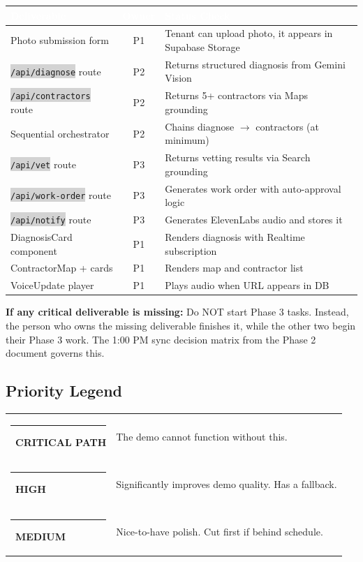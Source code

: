 \documentclass[11pt, a4paper]{article}
\newcommand{\critical}{\textcolor{critred}{\rule{6pt}{6pt}}~\textcolor{critred}{\scriptsize\textbf{CRITICAL PATH}}}
\newcommand{\highpri}{\textcolor{highamber}{\rule{6pt}{6pt}}~\textcolor{highamber}{\scriptsize\textbf{HIGH}}}
\newcommand{\medpri}{\textcolor{medgreen}{\rule{6pt}{6pt}}~\textcolor{medgreen}{\scriptsize\textbf{MEDIUM}}}
\newcommand{\code}[1]{\texttt{\small\colorbox{lightgray}{#1}}}
\begin{document}
\begin{tabularx}{\textwidth}{|l|c|X|}
\hline
\rowcolor{primary}
\textcolor{white}{\textbf{Deliverable}} & \textcolor{white}{\textbf{Owner}} & \textcolor{white}{\textbf{Status Check}} \\
\hline
Photo submission form & P1 & Tenant can upload photo, it appears in Supabase Storage \\
\hline
\code{/api/diagnose} route & P2 & Returns structured diagnosis from Gemini Vision \\
\hline
\code{/api/contractors} route & P2 & Returns 5+ contractors via Maps grounding \\
\hline
Sequential orchestrator & P2 & Chains diagnose $\rightarrow$ contractors (at minimum) \\
\hline
\code{/api/vet} route & P3 & Returns vetting results via Search grounding \\
\hline
\code{/api/work-order} route & P3 & Generates work order with auto-approval logic \\
\hline
\code{/api/notify} route & P3 & Generates ElevenLabs audio and stores it \\
\hline
DiagnosisCard component & P1 & Renders diagnosis with Realtime subscription \\
\hline
ContractorMap + cards & P1 & Renders map and contractor list \\
\hline
VoiceUpdate player & P1 & Plays audio when URL appears in DB \\
\hline
\end{tabularx}

\begin{dangerbox}
\textbf{If any critical deliverable is missing:} Do NOT start Phase 3 tasks. Instead, the person who owns the missing deliverable finishes it, while the other two begin their Phase 3 work. The 1:00 PM sync decision matrix from the Phase 2 document governs this.
\end{dangerbox}

\subsection{Priority Legend}

\begin{tabularx}{\textwidth}{lX}
\critical & The demo cannot function without this. \\[4pt]
\highpri & Significantly improves demo quality. Has a fallback. \\[4pt]
\medpri & Nice-to-have polish. Cut first if behind schedule. \\
\end{tabularx}
\end{document}

